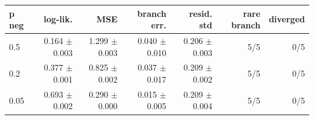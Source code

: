 \begin{tabular}{lrrrrrr}
\toprule
p neg & log-lik. & MSE & branch err. & resid. std & rare branch & diverged \\
\midrule
0.5 & 0.164 $\pm$ 0.003 & 1.299 $\pm$ 0.003 & 0.040 $\pm$ 0.010 & 0.206 $\pm$ 0.003 & 5/5 & 0/5 \\
0.2 & 0.377 $\pm$ 0.001 & 0.825 $\pm$ 0.002 & 0.037 $\pm$ 0.017 & 0.209 $\pm$ 0.002 & 5/5 & 0/5 \\
0.05 & 0.693 $\pm$ 0.002 & 0.290 $\pm$ 0.000 & 0.015 $\pm$ 0.005 & 0.209 $\pm$ 0.004 & 5/5 & 0/5 \\
\bottomrule
\end{tabular}

